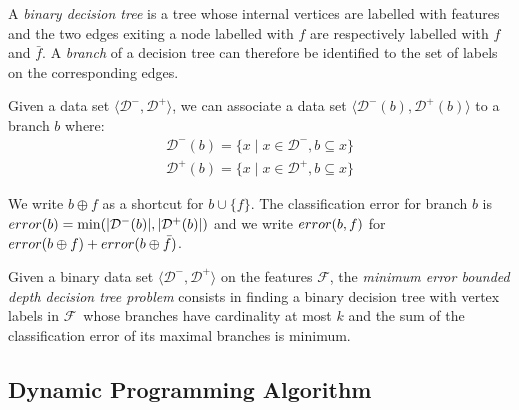 \documentclass{llncs}
\def\posclass{+}
\def\negclass{-}
\def\datasymb{D}
\newcommand{\setex}[1]{\ensuremath{{\mathcal \datasymb}^{#1}}\xspace}
\newcommand{\posex}{{\setex{\posclass}}\xspace}
\newcommand{\negex}{{\setex{\negclass}}\xspace}
\newcommand{\features}{\ensuremath{{\mathcal F}}\xspace}
\newcommand{\var}{\ensuremath{x}}
\newcommand{\ex}{\ensuremath{\var}}
\newcommand{\maxd}[0]{\ensuremath{k}}
\newcommand{\afeat}[0]{\ensuremath{f}}
\newcommand{\error}[1][]{\ensuremath{\ifthenelse{\equal{#1}{}}{{error}}{{error({{#1}})}}}}
\newcommand{\classlabel}[1][]{\ensuremath{\ifthenelse{\equal{#1}{}}{{y}}{{y({{#1}})}}}}
\newcommand{\abranch}[0]{\ensuremath{b}}
\newcommand{\mdepth}[0]{\ensuremath{k}}
\newcommand{\grow}[2]{\ensuremath{{#1}\oplus{#2}}}
\begin{document}
A \emph{binary decision tree} is a tree whose 
internal vertices are labelled with features and the two edges exiting a node labelled with $\afeat$ are respectively labelled with $\afeat$ and $\bar{\afeat}$.
A \emph{branch} of a decision tree can therefore be identified to the set of labels on the corresponding edges.

 
Given a data set $\langle \negex,\posex \rangle$, we can associate a data set $\langle \negex(\abranch),\posex(\abranch) \rangle$ to a branch $\abranch$ where:
\begin{eqnarray*}
\negex(\abranch) = \{\ex \mid \ex \in \negex, \abranch \subseteq \ex\}\\
\posex(\abranch) = \{\ex \mid \ex \in \posex, \abranch \subseteq \ex\}
\end{eqnarray*}

We write $\grow{\abranch}{\afeat}$ as a shortcut for $\abranch \cup \{\afeat\}$.
The classification error for branch $\abranch$ is $\error[\abranch]=\min(|\negex(\abranch)|, |\posex(\abranch)|)$
and we write $\error[\abranch,\afeat]$ for $\error[\grow{\abranch}{\afeat}] + \error[\grow{\abranch}{\bar{\afeat}}]$.

\medskip

Given a binary data set $\langle \negex,\posex \rangle$ on the features \features, %
the \emph{minimum error bounded depth decision tree problem} consists in finding a binary decision tree with vertex labels in \features\ whose branches have cardinality at most $\mdepth$ and the sum of the classification error %
of its maximal branches is minimum.


\subsection{Dynamic Programming Algorithm}
\end{document}
